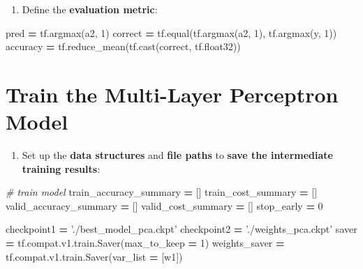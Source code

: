 \documentclass[]{book}
\newenvironment{Shaded}{\begin{snugshade}}{\end{snugshade}}
\newcommand{\DecValTok}[1]{\textcolor[rgb]{0.00,0.00,0.81}{#1}}
\newcommand{\StringTok}[1]{\textcolor[rgb]{0.31,0.60,0.02}{#1}}
\newcommand{\CommentTok}[1]{\textcolor[rgb]{0.56,0.35,0.01}{\textit{#1}}}
\newcommand{\OperatorTok}[1]{\textcolor[rgb]{0.81,0.36,0.00}{\textbf{#1}}}
\newcommand{\NormalTok}[1]{#1}
\providecommand{\tightlist}{%
  \setlength{\itemsep}{0pt}\setlength{\parskip}{0pt}}
\begin{document}
\begin{enumerate}
\def\labelenumi{\arabic{enumi}.}
\setcounter{enumi}{104}
\tightlist
\item
  Define the \textbf{evaluation metric}:
\end{enumerate}

\begin{Shaded}
\begin{Highlighting}[]
\NormalTok{pred }\OperatorTok{=}\NormalTok{ tf.argmax(a2, }\DecValTok{1}\NormalTok{)}
\NormalTok{correct }\OperatorTok{=}\NormalTok{ tf.equal(tf.argmax(a2, }\DecValTok{1}\NormalTok{), tf.argmax(y, }\DecValTok{1}\NormalTok{))}
\NormalTok{accuracy }\OperatorTok{=}\NormalTok{ tf.reduce_mean(tf.cast(correct, tf.float32))}
\end{Highlighting}
\end{Shaded}

\hypertarget{train-the-multi-layer-perceptron-model}{%
\section{Train the Multi-Layer Perceptron Model}\label{train-the-multi-layer-perceptron-model}}

\begin{enumerate}
\def\labelenumi{\arabic{enumi}.}
\setcounter{enumi}{105}
\tightlist
\item
  Set up the \textbf{data structures} and \textbf{file paths} to \textbf{save the intermediate training results}:
\end{enumerate}

\begin{Shaded}
\begin{Highlighting}[]
\CommentTok{# train model}
\NormalTok{train_accuracy_summary }\OperatorTok{=}\NormalTok{ []}
\NormalTok{train_cost_summary }\OperatorTok{=}\NormalTok{ []}
\NormalTok{valid_accuracy_summary }\OperatorTok{=}\NormalTok{ []}
\NormalTok{valid_cost_summary }\OperatorTok{=}\NormalTok{ []}
\NormalTok{stop_early }\OperatorTok{=} \DecValTok{0}

\NormalTok{checkpoint1 }\OperatorTok{=} \StringTok{'./best_model_pca.ckpt'}
\NormalTok{checkpoint2 }\OperatorTok{=} \StringTok{'./weights_pca.ckpt'}
\NormalTok{saver }\OperatorTok{=}\NormalTok{ tf.compat.v1.train.Saver(max_to_keep }\OperatorTok{=} \DecValTok{1}\NormalTok{)}
\NormalTok{weights_saver }\OperatorTok{=}\NormalTok{ tf.compat.v1.train.Saver(var_list }\OperatorTok{=}\NormalTok{ [w1])}
\end{Highlighting}
\end{Shaded}
\end{document}

